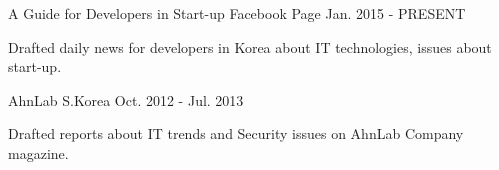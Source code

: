 

\begin{cventries}

	{A Guide for Developers in Start-up} %
	{Facebook Page} %
	{Jan. 2015 - PRESENT} %
	{
		\begin{cvitems} %
			\item {Drafted daily news for developers in Korea about IT technologies, issues about start-up.}
		\end{cvitems}
	}

	{AhnLab} %
	{S.Korea} %
	{Oct. 2012 - Jul. 2013} %
	{
		\begin{cvitems} %
			\item {Drafted reports about IT trends and Security issues on AhnLab Company magazine.}
		\end{cvitems}
	}

\end{cventries}
